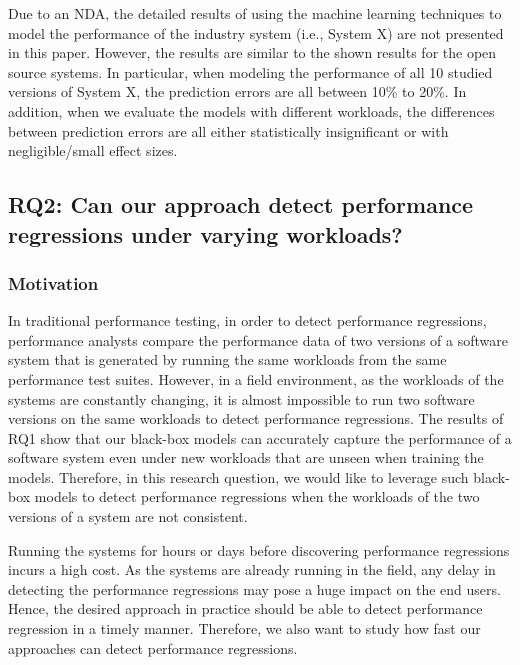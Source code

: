 Due to an NDA, the detailed results of using the machine learning techniques to model the performance of the industry system (i.e., System X) are not presented in this paper. However, the results are similar to the shown results for the open source systems. In particular, when modeling the performance of all 10 studied versions of System X, the prediction errors are all between 10\% to 20\%. In addition, when we evaluate the models with different workloads, the differences between prediction errors are all either statistically insignificant or with negligible/small effect sizes.




\subsection*{RQ2: Can our approach detect performance regressions under varying workloads?}

\subsubsection*{Motivation}

In traditional performance testing, in order to detect performance regressions, performance analysts compare the performance data of two versions of a software system that is generated by running the same workloads from the same performance test suites. 
However, in a field environment, as the workloads of the systems are constantly changing, it is almost impossible to run two software versions on the same workloads to detect performance regressions.
The results of RQ1 show that our black-box models can accurately capture the performance of a software system even under new workloads that are unseen when training the models.
Therefore, in this research question, we would like to leverage such black-box models to detect performance regressions when the workloads of the two versions of a system are not consistent.

Running the systems for hours or days before discovering performance regressions incurs a high cost. As the systems are already running in the field, any delay in detecting the performance regressions may pose a huge impact on the end users. Hence, the desired approach in practice should be able to detect performance regression in a timely manner. Therefore, we also want to study how fast our approaches can detect performance regressions. 

